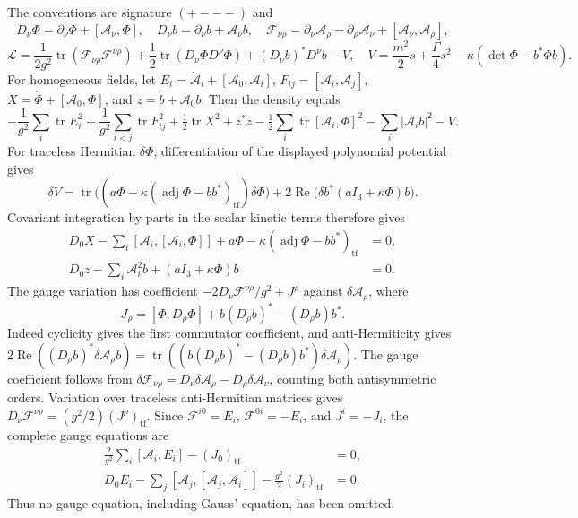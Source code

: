 \documentclass[11pt]{article}
\newcommand{\tf}{\mathrm{tf}}
\newcommand{\tr}{\operatorname{tr}}
\begin{document}
The conventions are signature $(+---)$ and
\[
 D_\nu\Phi=\partial_\nu\Phi+[\mathcal A_\nu,\Phi],\quad
 D_\nu b=\partial_\nu b+\mathcal A_\nu b,\quad
 \mathcal F_{\nu\rho}=\partial_\nu\mathcal A_\rho-
 \partial_\rho\mathcal A_\nu+[\mathcal A_\nu,\mathcal A_\rho],
\]
\[
 \mathcal L=\frac1{2g^2}\tr(\mathcal F_{\nu\rho}\mathcal F^{\nu\rho})
 +\frac12\tr(D_\nu\Phi D^\nu\Phi)+(D_\nu b)^*D^\nu b-V,
 \quad
 V=\frac{m^2}{2}s+\frac\Gamma4s^2-\kappa(\det\Phi-b^*\Phi b).
\]
For homogeneous fields, let $E_i=\dot{\mathcal A}_i+
[\mathcal A_0,\mathcal A_i]$, $F_{ij}=[\mathcal A_i,\mathcal A_j]$,
$X=\dot\Phi+[\mathcal A_0,\Phi]$, and $z=\dot b+\mathcal A_0b$.
Then the density equals
\[
 -\frac1{g^2}\sum_i\tr E_i^2+\frac1{g^2}\sum_{i<j}\tr F_{ij}^2
 +\tfrac12\tr X^2+z^*z
 -\tfrac12\sum_i\tr[\mathcal A_i,\Phi]^2
 -\sum_i|\mathcal A_i b|^2-V.
\]
For traceless Hermitian $\delta\Phi$, differentiation of the displayed
polynomial potential gives
\[
 \delta V=\tr\bigl((a\Phi-
 \kappa(\operatorname{adj}\Phi-bb^*)_{\tf})\delta\Phi\bigr)
 +2\operatorname{Re}\bigl(\delta b^*(aI_3+\kappa\Phi)b\bigr).
\]
Covariant integration by parts in the scalar kinetic terms therefore gives
\begin{align}
 D_0X-\sum_i[\mathcal A_i,[\mathcal A_i,\Phi]]
       +a\Phi-\kappa(\operatorname{adj}\Phi-bb^*)_{\tf}&=0,\label{eq:fullphi}\\
 D_0z-\sum_i\mathcal A_i^2b+(aI_3+\kappa\Phi)b&=0.\label{eq:fullb}
\end{align}
The gauge variation has coefficient
$-2D_\nu\mathcal F^{\nu\rho}/g^2+J^\rho$ against
$\delta\mathcal A_\rho$, where
\[
 J_\rho=[\Phi,D_\rho\Phi]+b(D_\rho b)^*-(D_\rho b)b^*.
\]
Indeed cyclicity gives the first commutator coefficient, and
anti-Hermiticity gives
$2\operatorname{Re}((D_\rho b)^*\delta\mathcal A_\rho b)
=\tr((b(D_\rho b)^*-(D_\rho b)b^*)\delta\mathcal A_\rho)$.
The gauge coefficient follows from
$\delta\mathcal F_{\nu\rho}=D_\nu\delta\mathcal A_\rho-
D_\rho\delta\mathcal A_\nu$, counting both antisymmetric orders.
Variation over traceless anti-Hermitian matrices gives
$D_\nu\mathcal F^{\nu\rho}=(g^2/2)(J^\rho)_{\tf}$.
Since $\mathcal F^{i0}=E_i$, $\mathcal F^{0i}=-E_i$, and $J^i=-J_i$,
the complete gauge equations are
\begin{align}
 \frac2{g^2}\sum_i[\mathcal A_i,E_i]-(J_0)_{\tf}&=0,\label{eq:gaussorig}\\
 D_0E_i-\sum_j[\mathcal A_j,[\mathcal A_j,\mathcal A_i]]
            -\frac{g^2}{2}(J_i)_{\tf}&=0.\label{eq:spatialorig}
\end{align}
Thus no gauge equation, including Gauss' equation, has been omitted.
\end{document}
